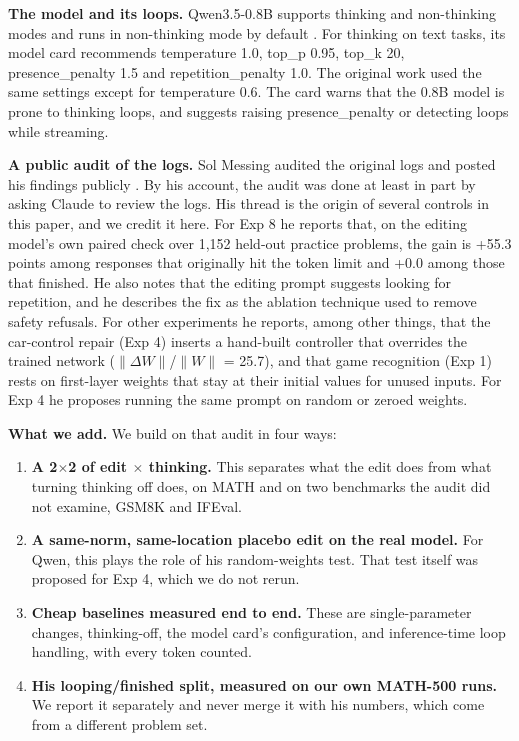 \documentclass[11pt]{article}
\begin{document}
\textbf{The model and its loops.} Qwen3.5-0.8B supports thinking and non-thinking modes and runs in non-thinking mode by default \citep{qwen2026}. For thinking on text tasks, its model card recommends temperature 1.0, top\_\allowbreak{}p 0.95, top\_\allowbreak{}k 20, presence\_\allowbreak{}penalty 1.5 and repetition\_\allowbreak{}penalty 1.0. The original work used the same settings except for temperature 0.6. The card warns that the 0.8B model is prone to thinking loops, and suggests raising presence\_\allowbreak{}penalty or detecting loops while streaming.

\textbf{A public audit of the logs.} Sol Messing audited the original logs and posted his findings publicly \citep{messing2026}. By his account, the audit was done at least in part by asking Claude to review the logs. His thread is the origin of several controls in this paper, and we credit it here. For Exp 8 he reports that, on the editing model's own paired check over 1,152 held-out practice problems, the gain is +55.3 points among responses that originally hit the token limit and +0.0 among those that finished. He also notes that the editing prompt suggests looking for repetition, and he describes the fix as the ablation technique used to remove safety refusals. For other experiments he reports, among other things, that the car-control repair (Exp 4) inserts a hand-built controller that overrides the trained network ($\|\Delta W\|$/$\|W\|$ = 25.7), and that game recognition (Exp 1) rests on first-layer weights that stay at their initial values for unused inputs. For Exp 4 he proposes running the same prompt on random or zeroed weights.

\textbf{What we add.} We build on that audit in four ways:

\begin{enumerate}[nosep,leftmargin=*]
\item \textbf{A 2$\times$2 of edit $\times$ thinking.} This separates what the edit does from what turning thinking off does, on MATH and on two benchmarks the audit did not examine, GSM8K and IFEval.
\item \textbf{A same-norm, same-location placebo edit on the real model.} For Qwen, this plays the role of his random-weights test. That test itself was proposed for Exp 4, which we do not rerun.
\item \textbf{Cheap baselines measured end to end.} These are single-parameter changes, thinking-off, the model card's configuration, and inference-time loop handling, with every token counted.
\item \textbf{His looping/finished split, measured on our own MATH-500 runs.} We report it separately and never merge it with his numbers, which come from a different problem set.
\end{enumerate}
\end{document}
